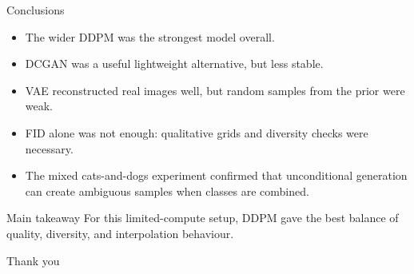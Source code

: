 \documentclass[aspectratio=169]{beamer}
\begin{document}
\begin{frame}{Conclusions}
  \begin{itemize}
    \item The wider DDPM was the strongest model overall.
    \item DCGAN was a useful lightweight alternative, but less stable.
    \item VAE reconstructed real images well, but random samples from the prior were weak.
    \item FID alone was not enough: qualitative grids and diversity checks were necessary.
    \item The mixed cats-and-dogs experiment confirmed that unconditional generation can create ambiguous samples when classes are combined.
  \end{itemize}

  \vspace{0.4cm}
  \begin{block}{Main takeaway}
    For this limited-compute setup, DDPM gave the best balance of quality, diversity, and interpolation behaviour.
  \end{block}
\end{frame}

\begin{frame}[plain]
  \centering
  \vfill
  {\Huge Thank you}
  \vfill
\end{frame}
\end{document}
